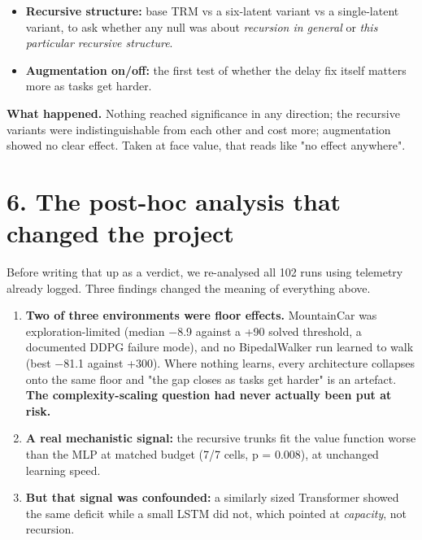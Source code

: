 \documentclass[11pt]{article}
\begin{document}
\begin{itemize}
\item \textbf{Recursive structure:} base TRM vs a six-latent variant vs a single-latent variant, to ask whether any null was about \emph{recursion in general} or \emph{this particular recursive structure}.
\item \textbf{Augmentation on/off:} the first test of whether the delay fix itself matters more as tasks get harder.
\end{itemize}



\textbf{What happened.} Nothing reached significance in any direction; the recursive variants were indistinguishable from each other and cost more; augmentation showed no clear effect. Taken at face value, that reads like "no effect anywhere".



\section*{6. The post-hoc analysis that changed the project}



Before writing that up as a verdict, we re-analysed all 102 runs using telemetry already logged. Three findings changed the meaning of everything above.



\begin{enumerate}
\item \textbf{Two of three environments were floor effects.} MountainCar was exploration-limited (median $-$8.9 against a +90 solved threshold, a documented DDPG failure mode), and no BipedalWalker run learned to walk (best $-$81.1 against +300). Where nothing learns, every architecture collapses onto the same floor and "the gap closes as tasks get harder" is an artefact. \textbf{The complexity-scaling question had never actually been put at risk.}
\item \textbf{A real mechanistic signal:} the recursive trunks fit the value function worse than the MLP at matched budget (7/7 cells, p = 0.008), at unchanged learning speed.
\item \textbf{But that signal was confounded:} a similarly sized Transformer showed the same deficit while a small LSTM did not, which pointed at \emph{capacity}, not recursion.
\end{enumerate}
\end{document}
